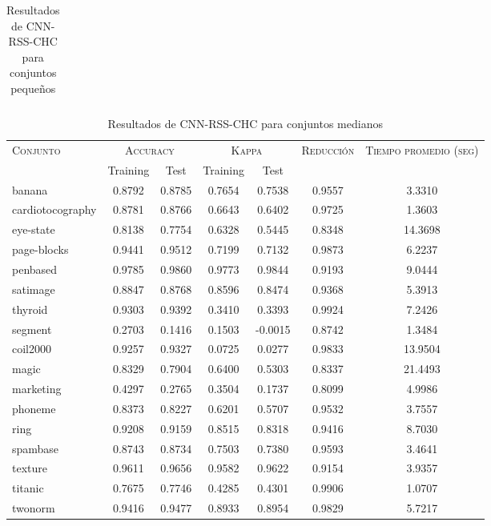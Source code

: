 \begin{table}[]
\begin{tabular}{l c c c c c c}
\hline
\end{tabular}
\caption{Resultados de CNN-RSS-CHC para conjuntos pequeños }
\label{res-peq-CNN-RSS-CHC}
\end{table}


\begin{table}[]
\centering
\begin{tabular}{l c c c c c c}
\hline
\multirow{2}{*}{\textsc{Conjunto}}
	& \multicolumn{2}{c}{\textsc{Accuracy}}
	& \multicolumn{2}{c}{\textsc{Kappa}}
	& \textsc{Reducción}
	& \textsc{Tiempo promedio (seg)} \\
	& Training & Test
	& Training & Test \\ 
\hline
\hline

banana & 0.8792 & 0.8785 & 0.7654 & 0.7538 & 0.9557 & 3.3310 \\
cardiotocography & 0.8781 & 0.8766 & 0.6643 & 0.6402 & 0.9725 & 1.3603 \\
eye-state & 0.8138 & 0.7754 & 0.6328 & 0.5445 & 0.8348 & 14.3698 \\
page-blocks & 0.9441 & 0.9512 & 0.7199 & 0.7132 & 0.9873 & 6.2237 \\
penbased & 0.9785 & 0.9860 & 0.9773 & 0.9844 & 0.9193 & 9.0444 \\
satimage & 0.8847 & 0.8768 & 0.8596 & 0.8474 & 0.9368 & 5.3913 \\
thyroid & 0.9303 & 0.9392 & 0.3410 & 0.3393 & 0.9924 & 7.2426 \\
segment & 0.2703 & 0.1416 & 0.1503 & -0.0015 & 0.8742 & 1.3484 \\
coil2000 & 0.9257 & 0.9327 & 0.0725 & 0.0277 & 0.9833 & 13.9504 \\
magic & 0.8329 & 0.7904 & 0.6400 & 0.5303 & 0.8337 &  21.4493 \\
marketing & 0.4297 & 0.2765 & 0.3504 & 0.1737 & 0.8099 & 4.9986 \\
phoneme & 0.8373 & 0.8227 & 0.6201 & 0.5707 & 0.9532 & 3.7557 \\
ring & 0.9208 & 0.9159 & 0.8515 & 0.8318 & 0.9416 & 8.7030 \\
spambase & 0.8743 & 0.8734 & 0.7503 & 0.7380 & 0.9593 & 3.4641 \\
texture & 0.9611 & 0.9656 & 0.9582 & 0.9622 & 0.9154 & 3.9357 \\
titanic & 0.7675 & 0.7746 & 0.4285 & 0.4301 & 0.9906 & 1.0707 \\
twonorm & 0.9416 & 0.9477 & 0.8933 & 0.8954 & 0.9829 & 5.7217 \\	

\hline
\end{tabular}
\caption{Resultados de CNN-RSS-CHC para conjuntos medianos }
\label{res-med-CNN-RSS-CHC}
\end{table}


